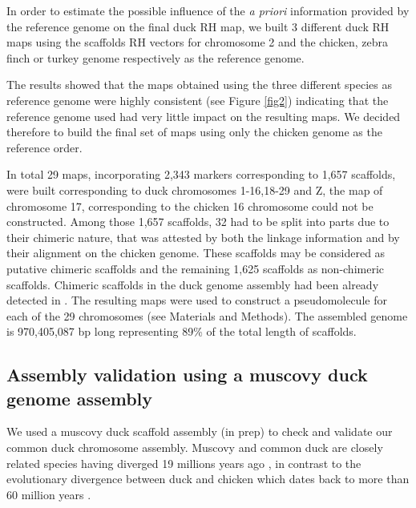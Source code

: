 \documentclass[10pt,letterpaper]{article}
\begin{document}
In order to estimate the possible influence of the {\em a priori} information provided by the reference genome on the final duck RH map, we built 3 different duck RH maps using the scaffolds RH vectors for chromosome 2 and the chicken, zebra finch or turkey genome respectively as the reference genome. 

The results showed that the maps obtained using the three different species as reference genome were highly consistent (see Figure \ref{fig2}) indicating that the reference genome used had very little impact on the resulting maps. We decided therefore to build the final set of maps using only the chicken genome as the reference order.

In total 29 maps, incorporating 2,343 markers corresponding to 1,657 scaffolds, were built corresponding to duck chromosomes 1-16,18-29 and Z, the map of chromosome 17, corresponding to the chicken 16 chromosome could not be constructed. Among those 1,657 scaffolds, 32 had to be split into parts due to their chimeric nature, that was attested by both the linkage information and by their alignment on the chicken genome. These scaffolds %
may be considered as putative chimeric scaffolds and the remaining 1,625 scaffolds as non-chimeric scaffolds. Chimeric scaffolds in the duck genome assembly had been already detected in \cite{Rao2012}. The resulting maps were used to construct a pseudomolecule for each of the 29 chromosomes (see Materials and Methods). The assembled genome is 970,405,087 bp long representing 89\% of the total length of scaffolds.

\subsection*{Assembly validation using a muscovy duck genome assembly}

We used a muscovy duck scaffold assembly (in prep) to check and validate our common duck chromosome assembly. Muscovy and common duck are closely related species having diverged 19 millions years ago \cite{Hedges2006}, in contrast to the evolutionary divergence between duck and chicken which dates back to more than 60 million years \cite{Hedges2006}.
\end{document}
